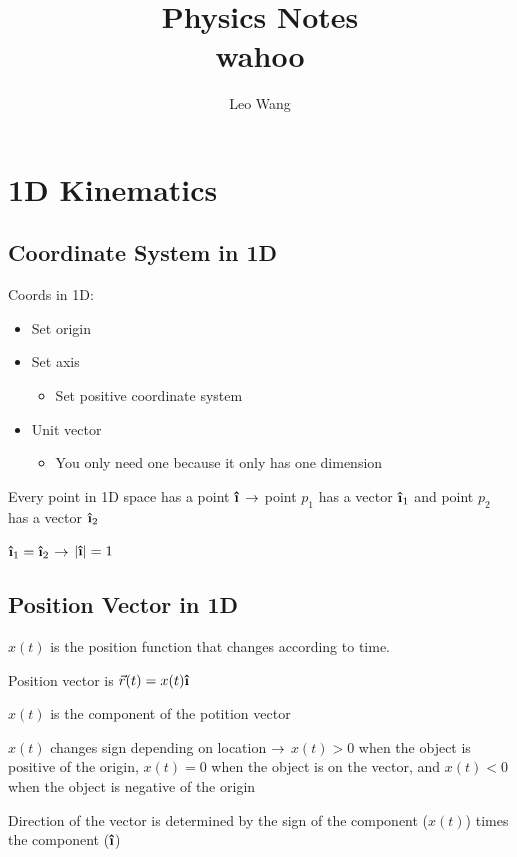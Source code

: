 \documentclass{report}
\title{\Huge{Physics Notes}\\wahoo}
\author{\huge{Leo Wang}}
\date{}
\begin{document}
\maketitle
\newpage%
\tableofcontents
\pagebreak

\chapter{1D Kinematics}
\section{Coordinate System in 1D}
Coords in 1D:
\begin{itemize}
  \item Set origin
  \item Set axis
  \begin{itemize}
    \item Set positive coordinate system
  \end{itemize}
  \item Unit vector
  \begin{itemize}
    \item You only need one because it only has one dimension
  \end{itemize}
\end{itemize}

Every point in 1D space has a point $\ihat$ $\rightarrow$ point $p_1$ has a vector $\ihat_1$ and point $p_2$ has a vector $\ihat_2$

$\ihat_1 = \ihat_2$ $\rightarrow$ $|\ihat| = 1$

\section{Position Vector in 1D}

$x(t)$ is the position function that changes according to time. 

Position vector is $\vec{r}(t) = x(t)\ihat$

$x(t)$ is the component of the potition vector

$x(t)$ changes sign depending on location $\rightarrow$ $x(t)>0$ when the object is positive of the origin, $x(t)=0$ when the object is on the vector, and $x(t)<0$ when the object is negative of the origin

Direction of the vector is determined by the sign of the component ($x(t)$) times the component ($\ihat$)
\end{document}
